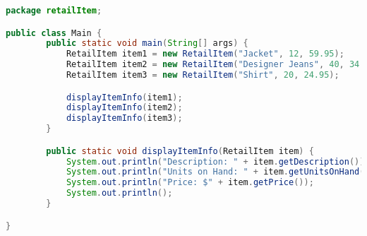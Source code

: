 \documentclass{article}
\begin{document}
\begin{lstlisting}[language=Java, caption=Main.java]
package retailItem;

public class Main {
        public static void main(String[] args) {
            RetailItem item1 = new RetailItem("Jacket", 12, 59.95);
            RetailItem item2 = new RetailItem("Designer Jeans", 40, 34.95);
            RetailItem item3 = new RetailItem("Shirt", 20, 24.95);

            displayItemInfo(item1);
            displayItemInfo(item2);
            displayItemInfo(item3);
        }

        public static void displayItemInfo(RetailItem item) {
            System.out.println("Description: " + item.getDescription());
            System.out.println("Units on Hand: " + item.getUnitsOnHand());
            System.out.println("Price: $" + item.getPrice());
            System.out.println();
        }

}

\end{lstlisting}

\end{document}
